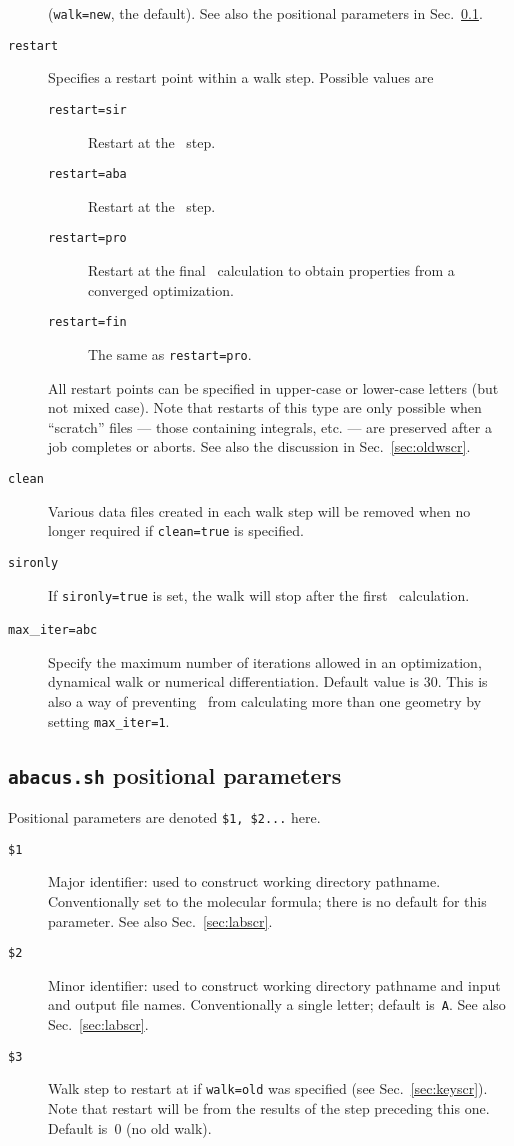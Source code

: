 \begin{description}
(\verb|walk=new|, the default).  See also the positional
parameters in Sec.~\ref{sec:pospscr}.
\item[\verb|restart|] Specifies a restart point within a walk
step.  Possible values are
\begin{description}
\item[\verb|restart=sir|] Restart at the \sir\ step.
\item[\verb|restart=aba|] Restart at the \aba\ step.
\item[\verb|restart=pro|] Restart at the final \aba\ calculation
to obtain properties from a converged optimization.
\item[\verb|restart=fin|] The same as \verb|restart=pro|.
\end{description}
All restart points can be specified in upper-case or lower-case
letters (but not mixed case).  Note that restarts of this type are
only possible when ``scratch'' files --- those containing
integrals, etc. --- are preserved after a job completes or aborts.
See also the discussion in Sec.~\ref{sec:oldwscr}.
\item[\verb|clean |] Various data files created in each walk step
will be removed when no longer required if \verb|clean=true| is
specified.
\item[\verb|sironly|] If \verb|sironly=true| is set, the walk will
stop after the first \sir\ calculation.
\item[\verb|max|\_\verb|iter=abc|] Specify the maximum number of iterations
allowed in an optimization, dynamical walk or numerical
differentiation. Default value is $30$. This is also a way of
preventing \aba\ from calculating more than one geometry by setting
\verb|max_iter=1|.
\end{description}

\subsection{{\tt abacus.sh} positional parameters}
\label{sec:pospscr}

Positional parameters are denoted \verb|$1, $2...| here.
\begin{description}
\item[{\tt \$1}] Major identifier: used to construct working
directory pathname.  Conventionally set to the molecular formula;
there is no default for this parameter.  See also
Sec.~\ref{sec:labscr}.
\item[{\tt \$2}] Minor identifier: used to construct working
directory pathname and input and output file names.
Conventionally a single letter; default is~\verb|A|.  See also
Sec.~\ref{sec:labscr}.
\item[{\tt \$3}] Walk step to restart at if \verb|walk=old| was
specified (see Sec.~\ref{sec:keyscr}).  Note that restart will be
from the results of the step preceding this one.  Default is~0 (no
old walk).
\end{description}

